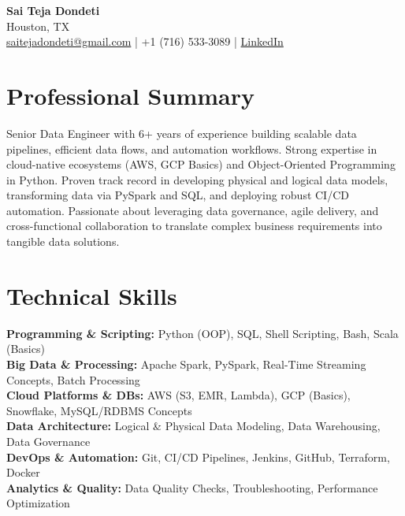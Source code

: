 \documentclass[10pt]{article}
\begin{document}
\begin{center}
    {\LARGE \textbf{Sai Teja Dondeti}} \\ %
    \vspace{2pt}
    Houston, TX \\ %
    \href{mailto:saitejadondeti@gmail.com}{saitejadondeti@gmail.com} \;|\; %
    +1 (716) 533-3089 \;|\; %
    \href{https://www.linkedin.com/in/sai-teja-dondeti/}{LinkedIn} %
\end{center}

\section*{Professional Summary}
Senior Data Engineer with 6+ years of experience building scalable data pipelines, efficient data flows, and automation workflows. %
Strong expertise in cloud-native ecosystems (AWS, GCP Basics) and Object-Oriented Programming in Python. %
Proven track record in developing physical and logical data models, transforming data via PySpark and SQL, and deploying robust CI/CD automation. %
Passionate about leveraging data governance, agile delivery, and cross-functional collaboration to translate complex business requirements into tangible data solutions. %

\section*{Technical Skills} %

\textbf{Programming \& Scripting:} Python (OOP), SQL, Shell Scripting, Bash, Scala (Basics) \\
\textbf{Big Data \& Processing:} Apache Spark, PySpark, Real-Time Streaming Concepts, Batch Processing \\
\textbf{Cloud Platforms \& DBs:} AWS (S3, EMR, Lambda), GCP (Basics), Snowflake, MySQL/RDBMS Concepts \\
\textbf{Data Architecture:} Logical \& Physical Data Modeling, Data Warehousing, Data Governance \\
\textbf{DevOps \& Automation:} Git, CI/CD Pipelines, Jenkins, GitHub, Terraform, Docker \\
\textbf{Analytics \& Quality:} Data Quality Checks, Troubleshooting, Performance Optimization
\end{document}
